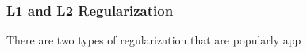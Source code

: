 \subsubsection{L1 and L2 Regularization}

There are two types of regularization that are popularly app